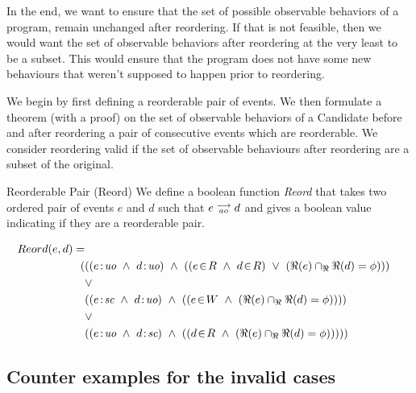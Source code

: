     In the end, we want to ensure that the set of possible observable behaviors of a program, remain unchanged after reordering. If that is not feasible, then we would want the set of observable behaviors after reordering at the very least to be a subset. This would ensure that the program does not have some new behaviours that weren't supposed to happen prior to reordering. 
    
    We begin by first defining a reorderable pair of events. We then formulate a theorem (with a proof) on the set of observable behaviors of a Candidate before and after reordering a pair of consecutive events which are reorderable. We consider reordering valid if the set of observable behaviours after reordering are a subset of the original. 

    \begin{definition}{Reorderable Pair (Reord)}
        We define a boolean function \emph{Reord} that takes two ordered pair of events $e$ and $d$ such that $e\stackrel{\longrightarrow}{_{ao}}d$ and gives a boolean value indicating if they are a reorderable pair. 
        
        \begin{align*}
            Reord(e,d) = \\
            (
            &((\et{e}{uo} \ \wedge \ \et{d}{uo}) \ \wedge \ 
                    (   
                        (\event{e}{R} \ \wedge \ \event{d}{R}) \ \vee \ 
                        (\Re(e) \cap_\Re \Re(d) = \phi) 
                    )
            ) \\ &\vee \\
            &((\et{e}{sc} \ \wedge \ \et{d}{uo}) \ \wedge \ 
                    (
                        (\event{e}{W} \ \wedge \ (\Re(e) \cap_\Re \Re(d) = \phi)) 
                    )
            ) \\ &\vee \\
            &((\et{e}{uo} \ \wedge \ \et{d}{sc}) \ \wedge \ 
                    (
                        (\event{d}{R} \ \wedge \ (\Re(e) \cap_\Re \Re(d) = \phi)) 
                    )
            )
            )
        \end{align*}


         
    \end{definition}

    

    

    


\subsection{Counter examples for the invalid cases}

\subsection{}

    

    
    
    
    
    
